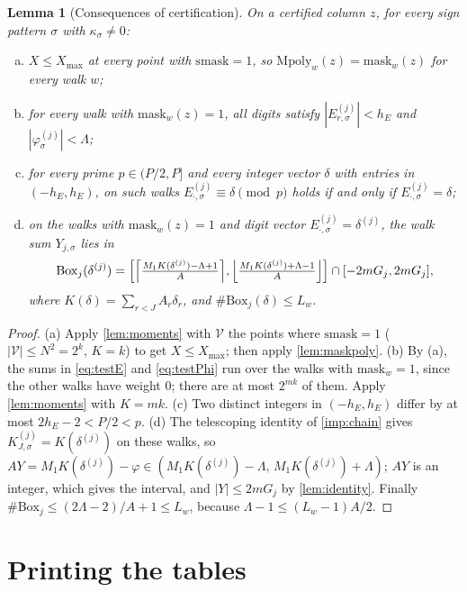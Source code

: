 \documentclass[11pt,letterpaper]{article}
\newtheorem{lemma}[theorem]{Lemma}
\theoremstyle{definition}
\theoremstyle{remark}
\newcommand{\smask}{\mathrm{smask}}
\newcommand{\mask}{\mathrm{mask}}
\newcommand{\Mpoly}{\mathrm{Mpoly}}
\newcommand{\Bx}{\mathrm{Box}}
\newcommand{\Xmax}{X_{\max}}
\begin{document}
\begin{lemma}[Consequences of certification]\label{lem:certify}
On a certified column \(z\), for every sign pattern \(\sigma\) with
\(\kappa_\sigma\ne0\):
\begin{enumerate}[(a)]
\item \(X\le\Xmax\) at every point with \(\smask=1\), so
\(\Mpoly_w(z)=\mask_w(z)\) for every walk \(w\);
\item for every walk with \(\mask_w(z)=1\), all digits satisfy
\(|E^{(j)}_{r,\sigma}|<h_E\) and \(|\varphi^{(j)}_\sigma|<\Lambda\);
\item for every prime \(p\in(P/2,P]\) and every integer vector
\(\delta\) with entries in \((-h_E,h_E)\), on such walks
\(E^{(j)}_{\cdot,\sigma}\equiv\delta\pmod p\) holds if and only if
\(E^{(j)}_{\cdot,\sigma}=\delta\);
\item on the walks with \(\mask_w(z)=1\) and digit vector
\(E^{(j)}_{\cdot,\sigma}=\delta^{(j)}\), the walk sum \(Y_{j,\sigma}\)
lies in
\[
 \Bx_j(\delta^{(j)})=\Bigl[\Bigl\lceil\tfrac{M_1K(\delta^{(j)})-\Lambda+1}{A}\Bigr\rceil,
 \Bigl\lfloor\tfrac{M_1K(\delta^{(j)})+\Lambda-1}{A}\Bigr\rfloor\Bigr]\cap[-2mG_j,2mG_j],
\]
where \(K(\delta)=\sum_{r<J}A_r\delta_r\), and
\(\#\Bx_j(\delta)\le L_w\).
\end{enumerate}
\end{lemma}
\begin{proof}
(a) Apply \cref{lem:moments} with \(\mathcal V\) the points where
\(\smask=1\) (\(|\mathcal V|\le N^2=2^k\), \(K=k\)) to get \(X\le\Xmax\);
then apply \cref{lem:maskpoly}. (b) By (a), the sums in
\eqref{eq:testE} and \eqref{eq:testPhi} run over the walks with
\(\mask_w=1\), since the other walks have weight \(0\); there are at most
\(2^{mk}\) of them. Apply \cref{lem:moments} with \(K=mk\). (c) Two
distinct integers in \((-h_E,h_E)\) differ by at most
\(2h_E-2<P/2<p\). (d) The telescoping identity of \cref{imp:chain}
gives \(K^{(j)}_{J,\sigma}=K(\delta^{(j)})\) on these walks, so
\(AY=M_1K(\delta^{(j)})-\varphi\in(M_1K(\delta^{(j)})-\Lambda,\,M_1K(\delta^{(j)})+\Lambda)\);
\(AY\) is an integer, which gives the interval, and \(|Y|\le2mG_j\) by
\cref{lem:identity}. Finally \(\#\Bx_j\le(2\Lambda-2)/A+1\le L_w\),
because \(\Lambda-1\le(L_w-1)A/2\).
\end{proof}

\section{Printing the tables}\label{sec:printing}
\end{document}
